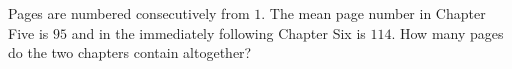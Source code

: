 Pages are numbered consecutively from $1$. The mean page number in Chapter Five is $95$ and in the immediately following Chapter Six is $114$. How many pages do the two chapters contain altogether?
